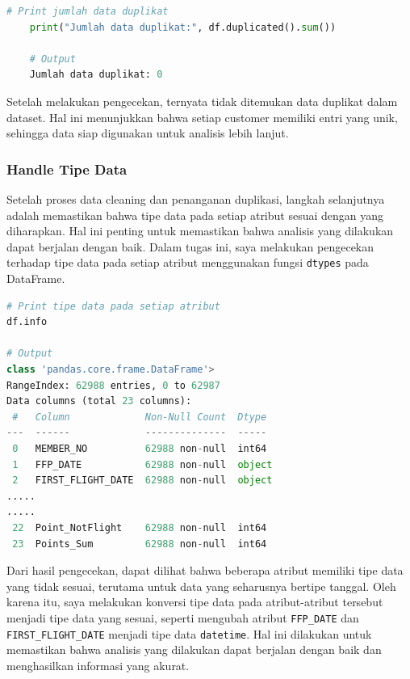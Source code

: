 \begin{lstlisting}[language=Python]
    # Print jumlah data duplikat
    print("Jumlah data duplikat:", df.duplicated().sum())

    # Output
    Jumlah data duplikat: 0
\end{lstlisting}

Setelah melakukan pengecekan, ternyata tidak ditemukan data duplikat dalam dataset. Hal ini menunjukkan bahwa setiap customer memiliki entri yang unik, sehingga data siap digunakan untuk analisis lebih lanjut.

\newpage

\subsubsection{Handle Tipe Data}
Setelah proses data cleaning dan penanganan duplikasi, langkah selanjutnya adalah memastikan bahwa tipe data pada setiap atribut sesuai dengan yang diharapkan. Hal ini penting untuk memastikan bahwa analisis yang dilakukan dapat berjalan dengan baik. Dalam tugas ini, saya melakukan pengecekan terhadap tipe data pada setiap atribut menggunakan fungsi \texttt{dtypes} pada DataFrame.

\begin{lstlisting}[language=Python]
# Print tipe data pada setiap atribut
df.info

# Output
class 'pandas.core.frame.DataFrame'>
RangeIndex: 62988 entries, 0 to 62987
Data columns (total 23 columns):
 #   Column             Non-Null Count  Dtype  
---  ------             --------------  -----  
 0   MEMBER_NO          62988 non-null  int64  
 1   FFP_DATE           62988 non-null  object 
 2   FIRST_FLIGHT_DATE  62988 non-null  object 
.....
.....
 22  Point_NotFlight    62988 non-null  int64  
 23  Points_Sum         62988 non-null  int64
\end{lstlisting}

Dari hasil pengecekan, dapat dilihat bahwa beberapa atribut memiliki tipe data yang tidak sesuai, terutama untuk data yang seharusnya bertipe tanggal. Oleh karena itu, saya melakukan konversi tipe data pada atribut-atribut tersebut menjadi tipe data yang sesuai, seperti mengubah atribut \texttt{FFP\_DATE} dan \texttt{FIRST\_FLIGHT\_DATE} menjadi tipe data \texttt{datetime}. Hal ini dilakukan untuk memastikan bahwa analisis yang dilakukan dapat berjalan dengan baik dan menghasilkan informasi yang akurat.

